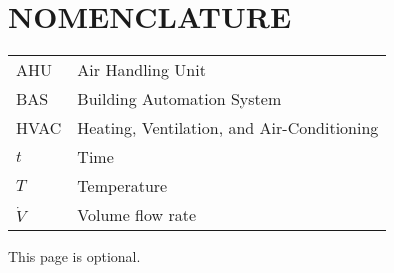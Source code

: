 %
%
%


\chapter*{NOMENCLATURE}

\begin{tabular}{ll}
AHU  & Air Handling Unit\tabularnewline
BAS & Building Automation System\tabularnewline
HVAC & Heating, Ventilation, and Air-Conditioning\tabularnewline
\(t\)  & Time\tabularnewline
\(T\) & Temperature\tabularnewline
\(\dot{V}\) & Volume flow rate\tabularnewline
\end{tabular}

\vspace{2em}

This page is optional.

\pagebreak{}